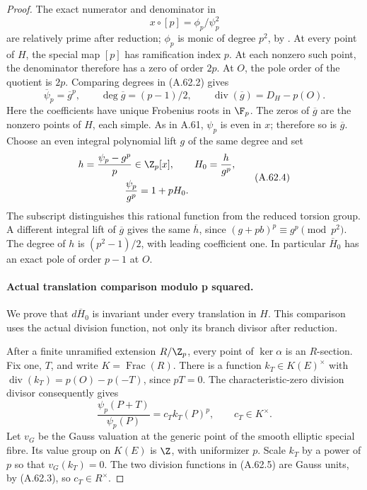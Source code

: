 \begin{proof}
The exact numerator and denominator in
\[
 x\circ[p]=\phi_p/\psi_p^2
                                                        \tag{A.62.2}
\]
are relatively prime after reduction; \(\phi_p\) is monic
of degree \(p^2\), by
\cite[Exercise III.3.7(a)--(d), pp.105--106]{fghSilvermanAEC}.
At every point of \(H\), the special map \([p]\) has
ramification index \(p\). At each nonzero such point,
the denominator therefore has a zero of order \(2p\).
At \(O\), the pole order of the quotient is \(2p\).
Comparing degrees in (A.62.2) gives
\[
 \overline\psi_p=\overline g^p,\qquad
 \deg\overline g=(p-1)/2,\qquad
 \operatorname{div}(\overline g)=D_H-p(O).
                                                        \tag{A.62.3}
\]
Here the coefficients have unique Frobenius roots in
\(\F_p\). The zeros of \(\overline g\) are the nonzero
points of \(H\), each simple. As in A.61, \(\psi_p\)
is even in \(x\); therefore so is \(\overline g\).
Choose an even integral polynomial lift \(g\) of the
same degree and set
\[
 \begin{gathered}
 h=\frac{\psi_p-g^p}{p}\in\Z_p[x],\qquad H_0=\frac{h}{g^p},\\
 \frac{\psi_p}{g^p}=1+pH_0.
 \end{gathered}
                                                        \tag{A.62.4}
\]
The subscript distinguishes this rational function from
the reduced torsion group. A different integral lift of
\(\overline g\) gives the same \(\overline h\), since
\((g+pb)^p\equiv g^p\pmod{p^2}\).
The degree of \(h\) is \((p^2-1)/2\), with leading
coefficient one. In particular \(\overline H_0\) has
an exact pole of order \(p-1\) at \(O\).

\paragraph{Actual translation comparison modulo p squared.}
We prove that \(d\overline H_0\) is invariant under
every translation in \(H\). This comparison uses the
actual division function, not only its branch divisor
after reduction.

After a finite unramified extension \(R/\Z_p\), every
point of \(\ker\alpha\) is an \(R\)-section. Fix one,
\(T\), and write \(K=\operatorname{Frac}(R)\).
There is a function \(k_T\in K(E)^\times\) with
\(\operatorname{div}(k_T)=p(O)-p(-T)\), since \(pT=0\).
The characteristic-zero division divisor consequently gives
\[
 \frac{\psi_p(P+T)}{\psi_p(P)}=c_T k_T(P)^p,
                         \qquad c_T\in K^\times.
                                                        \tag{A.62.5}
\]
Let \(v_G\) be the Gauss valuation at the generic point
of the smooth elliptic special fibre. Its value group
on \(K(E)\) is \(\Z\), with uniformizer \(p\).
Scale \(k_T\) by a power of \(p\) so that \(v_G(k_T)=0\).
The two division functions in (A.62.5) are Gauss units,
by (A.62.3), so \(c_T\in R^\times\).


\end{proof}
